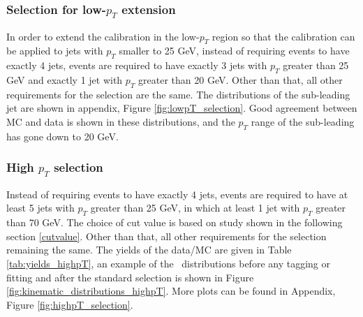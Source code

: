 \documentclass[letterpaper,12pt]{article}
\begin{document}
\subsubsection{Selection for low-$p_{T}$ extension}
In order to extend the calibration in the low-$p_{T}$ region so that the calibration 
can be applied to jets with $p_{T}$ smaller to 25 GeV, instead of requiring events to 
have exactly 4 jets, events are required to have exactly 3 jets with $p_{T}$ greater 
than 25 GeV and exactly 1 jet with $p_{T}$ greater than 20 GeV. Other than that, 
all other requirements for the selection are the same. The distributions of the sub-leading 
jet are shown in appendix, Figure \ref{fig:lowpT_selection}. Good agreement between MC and data 
is shown in these distributions, and the $p_{T}$ range of the sub-leading has gone down to 20 GeV. 



\subsubsection{High $p_T$ selection}
\label{high_pt_selection}
Instead of requiring events to have exactly 4 jets, events are required to 
have at least 5 jets with $p_{T}$ greater than 25 GeV, in which at least 
1 jet with $p_{T}$ greater than 70 GeV. The choice of cut value is based on 
study shown in the following section \ref{cutvalue}. Other than that, all 
other requirements for the selection remaining the same. 
The yields of the data/MC are given in Table \ref{tab:yields_highpT}, 
an example of the \pt\ distributions before any tagging or fitting and 
after the standard selection is shown in Figure \ref{fig:kinematic_distributions_highpT}. More plots 
can be found in Appendix, Figure \ref{fig:highpT_selection}.
\end{document}
